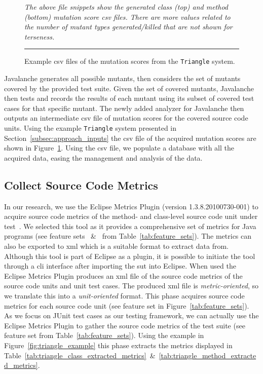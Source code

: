 \begin{figure}[b]
  \centering
  
  
  \caption{Example \gls{csv} files of the mutation scores from the \texttt{Triangle} system.}
  \vspace{1mm}
  \footnotesize{\emph{The above file snippets show the generated class (top) and method (bottom) mutation score \gls{csv} files. There are more values related to the number of mutant types generated/killed that are not shown for terseness.}}
  \vspace{2mm}
  \hrule
  \label{fig:triangle_mutation_scores}
\end{figure}

Javalanche generates all possible mutants, then considers the set of mutants covered by the provided test suite. Given the set of covered mutants, Javalanche then tests and records the results of each mutant using its subset of covered test cases for that specific mutant. The newly added analyzer for Javalanche then outputs an intermediate \gls{csv} file of mutation scores for the covered source code units. Using the example \texttt{Triangle} system presented in Section~\ref{subsec:approach_inputs} the \gls{csv} file of the acquired mutation scores are shown in Figure~\ref{fig:triangle_mutation_scores}. Using the \gls{csv} file, we populate a database with all the acquired data, easing the management and analysis of the data.


\subsection{Collect Source Code Metrics}
\label{subsec:approach_collect_source_metrics}
In our research, we use the Eclipse Metrics Plugin (version 1.3.8.20100730-001) to acquire source code metrics of the method- and class-level source code unit under test~\cite{Metrics}. We selected this tool as it provides a comprehensive set of metrics for Java programs (see feature sets ~\&~ from Table~\ref{tab:feature_sets}). The metrics can also be exported to \gls{xml} which is a suitable format to extract data from. Although this tool is part of Eclipse as a plugin, it is possible to initiate the tool through a \gls{cli} interface after importing the \gls{sut} into Eclipse. When used the Eclipse Metrics Plugin produces an \gls{xml} file of the source code metrics of the source code units and unit test cases. The produced \gls{xml} file is \emph{metric-oriented}, so we translate this into a \emph{unit-oriented} format. This phase acquires source code metrics for each source code unit (see feature set  in Figure~\ref{tab:feature_sets}). As we focus on JUnit test cases as our testing framework, we can actually use the Eclipse Metrics Plugin to gather the source code metrics of the test suite (see feature set  from Table~\ref{tab:feature_sets}). Using the example in Figure~\ref{fig:triangle_example} this phase extracts the metrics displayed in Table~\ref{tab:triangle_class_extracted_metrics}~\&~\ref{tab:triangle_method_extracted_metrics}.

